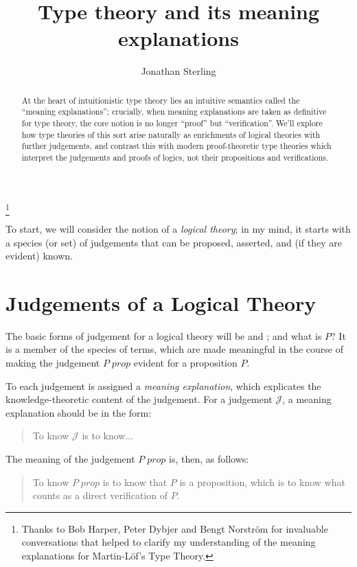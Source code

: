 \documentclass{amsart}
\theoremstyle{definition}
\theoremstyle{remark}
\numberwithin{equation}{section}
\newcommand\isprop[1]{\ensuremath{#1\;\mathit{prop}}}
\newcommand\istrue[1]{\ensuremath{#1\;\mathit{true}}}
\begin{document}
\title{Type theory and its meaning explanations}
\author{Jonathan Sterling}

\thanks{Thanks to Bob Harper, Peter Dybjer and Bengt Norstr\"om for invaluable
conversations that helped to clarify my understanding of the meaning
explanations for Martin-L\"of's Type Theory.}


\begin{abstract}
  At the heart of intuitionistic type theory lies an intuitive semantics called
  the ``meaning explanations''; crucially, when meaning explanations are taken as
  definitive for type theory, the core notion is no longer ``proof'' but
  ``verification''. We’ll explore how type theories of this sort arise naturally
  as enrichments of logical theories with further judgements, and contrast this
  with modern proof-theoretic type theories which interpret the judgements and
  proofs of logics, not their propositions and verifications.
\end{abstract}

\maketitle

\onehalfspacing

To start, we will consider the notion of a \emph{logical theory}; in my mind,
it starts with a species (or set) of judgements that can be proposed, asserted,
and (if they are evident) known.

\section{Judgements of a Logical Theory}

The basic forms of judgement for a logical theory will be \framebox{\isprop{P}} and
\framebox{\istrue{P}}; and what is $P$? It is a member of the species of terms,
which are made meaningful in the course of making the judgement
$\isprop{P}$ evident for a proposition $P$.

To each judgement is assigned a \emph{meaning explanation}, which explicates
the knowledge-theoretic content of the judgement. For a judgement
$\mathcal{J}$, a meaning explanation should be in the form:
\begin{quote}
  To know $\mathcal{J}$ is to know...
\end{quote}

The meaning of the judgement \isprop{P} is, then, as follows:
\begin{quote}
  To know \isprop{P} is to know that $P$ is a proposition, which is to know
  what counts as a direct verification of $P$.
\end{quote}
\end{document}
